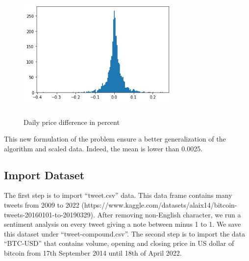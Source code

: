\documentclass[conference]{IEEEtran}
\begin{document}
\begin{figure}[H]
\includegraphics[width=8cm, height=6cm]{I1}
	\label{fig}
	\caption{Daily price difference in percent}
\end{figure}

This new formulation of the problem ensure a better generalization of the algorithm and scaled data. Indeed, the mean is lower than 0.0025.\newline
\newline




\subsection{Import Dataset}\label{AA}
The first step is to import “tweet.csv” data. This data frame contains many tweets from 2009 to 2022 (https://www.kaggle.com/datasets/alaix14/bitcoin-tweets-20160101-to-20190329). After removing non-English character, we run a sentiment analysis on every tweet giving a note between minus 1 to 1. We save this dataset under “tweet-compound.csv”. The second step is to import the data “BTC-USD” that contains volume, opening and closing price in US dollar of bitcoin from  17th September 2014 until 18th of April 2022. 
\end{document}
